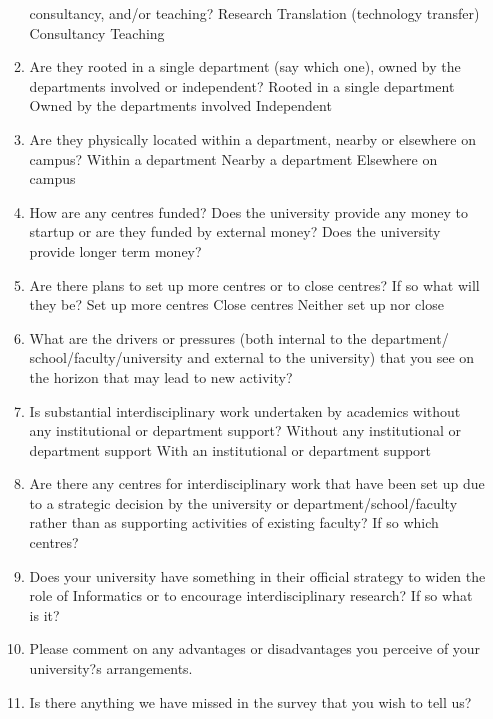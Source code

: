 \begin{enumerate}
\begin{enumerate}
consultancy, and/or teaching?
Research
Translation (technology transfer)
Consultancy
Teaching
\item Are they rooted in a single department (say which one), owned by
the departments involved or independent?
Rooted in a single department
Owned by the departments involved
Independent
\item Are they physically located within a department, nearby or
elsewhere on campus?
Within a department
Nearby a department
Elsewhere on campus
\item How are any centres funded? Does the university provide any
money to startup or are they funded by external money? Does the
university provide longer term money?
\item Are there plans to set up more centres or to close centres? If so
what will they be?
Set up more centres
Close centres
Neither set up nor close
\item What are the drivers or pressures (both internal to the department/
school/faculty/university and external to the university)
that you see on the horizon that may lead to new activity?
\item Is substantial interdisciplinary work undertaken by academics
without any institutional or department support?
Without any institutional or department support
With an institutional or department support
\item Are there any centres for interdisciplinary work that have been set
up due to a strategic decision by the university or
department/school/faculty rather than as supporting activities of
existing faculty? If so which centres?
\item Does your university have something in their official strategy to
widen the role of Informatics or to encourage interdisciplinary
research? If so what is it?
\item Please comment on any advantages or disadvantages you perceive of your university?s arrangements.
\item Is there anything we have missed in the survey that you wish to tell us?
\end{enumerate}
\end{enumerate}
